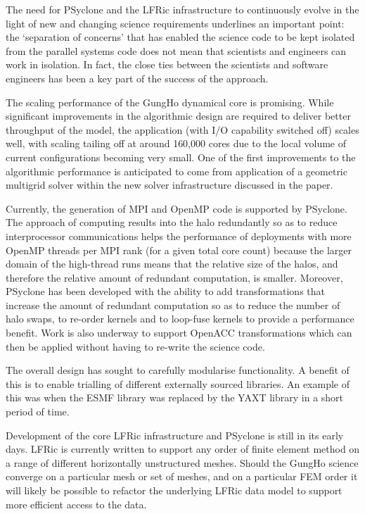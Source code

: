 \documentclass[review,times]{elsarticle}
\begin{document}
The need for PSyclone and the LFRic infrastructure to continuously
evolve in the light of new and changing science requirements
underlines an important point: the `separation of concerns' that has
enabled the science code to be kept isolated from the parallel systems
code does not mean that scientists and engineers can work in
isolation. In fact, the close ties between the scientists and software
engineers has been a key part of the success of the approach.

The scaling performance of the GungHo dynamical core is promising. While
significant improvements in the algorithmic design are required to
deliver better throughput of the model, the application (with I/O
capability switched off) scales well, with scaling tailing off at
around 160,000 cores due to the local volume of current configurations
becoming very small. One of the first improvements to the algorithmic
performance is anticipated to come from application of a geometric
multigrid solver within the new solver infrastructure discussed in the paper.

Currently, the generation of MPI and OpenMP code is supported by
PSyclone.  The approach of computing results into the halo redundantly
so as to reduce interprocessor communications helps the performance of
deployments with more OpenMP threads per MPI rank (for a given total
core count) because the larger domain of the high-thread runs means
that the relative size of the halos, and therefore the relative amount
of redundant computation, is smaller.  Moreover, PSyclone has been
developed with the ability to add transformations that increase the
amount of redundant computation so as to reduce the number of halo
swaps, to re-order kernels and to loop-fuse kernels to provide a
performance benefit. Work is also underway to support OpenACC
transformations which can then be applied without having to re-write
the science code.

The overall design has sought to carefully modularise functionality. A
benefit of this is to enable trialling of different externally sourced
libraries. An example of this was when the ESMF library was replaced by the
YAXT library in a short period of time.

Development of the core LFRic infrastructure and PSyclone is still in
its early days. LFRic is currently written to support any order of finite
element method on a range of different horizontally unstructured meshes.
Should the GungHo science converge on a particular mesh or set of meshes,
and on a particular FEM order it will likely be possible to refactor the
underlying LFRic data model to support more efficient access to the
data.
\end{document}
